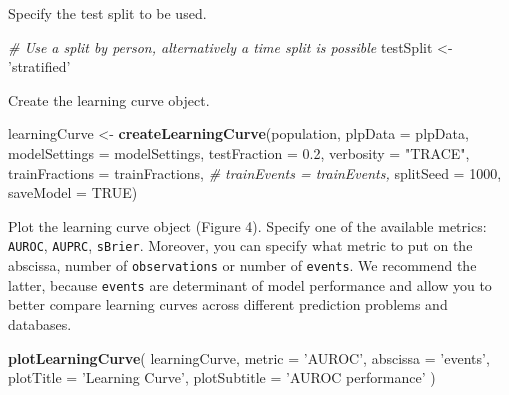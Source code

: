 \documentclass[
]{article}
\newenvironment{Shaded}{\begin{snugshade}}{\end{snugshade}}
\newcommand{\CommentTok}[1]{\textcolor[rgb]{0.56,0.35,0.01}{\textit{#1}}}
\newcommand{\DataTypeTok}[1]{\textcolor[rgb]{0.13,0.29,0.53}{#1}}
\newcommand{\DecValTok}[1]{\textcolor[rgb]{0.00,0.00,0.81}{#1}}
\newcommand{\FloatTok}[1]{\textcolor[rgb]{0.00,0.00,0.81}{#1}}
\newcommand{\KeywordTok}[1]{\textcolor[rgb]{0.13,0.29,0.53}{\textbf{#1}}}
\newcommand{\NormalTok}[1]{#1}
\newcommand{\OtherTok}[1]{\textcolor[rgb]{0.56,0.35,0.01}{#1}}
\newcommand{\StringTok}[1]{\textcolor[rgb]{0.31,0.60,0.02}{#1}}
\begin{document}
Specify the test split to be used.

\begin{Shaded}
\begin{Highlighting}[]
\CommentTok{# Use a split by person, alternatively a time split is possible}
\NormalTok{testSplit <-}\StringTok{ 'stratified'}
\end{Highlighting}
\end{Shaded}

Create the learning curve object.

\begin{Shaded}
\begin{Highlighting}[]
\NormalTok{learningCurve <-}\StringTok{ }\KeywordTok{createLearningCurve}\NormalTok{(population,}
                                     \DataTypeTok{plpData =}\NormalTok{ plpData,}
                                     \DataTypeTok{modelSettings =}\NormalTok{ modelSettings,}
                                     \DataTypeTok{testFraction =} \FloatTok{0.2}\NormalTok{,}
                                     \DataTypeTok{verbosity =} \StringTok{"TRACE"}\NormalTok{,}
                                     \DataTypeTok{trainFractions =}\NormalTok{ trainFractions,}
                                     \CommentTok{# trainEvents = trainEvents,}
                                     \DataTypeTok{splitSeed =} \DecValTok{1000}\NormalTok{,}
                                     \DataTypeTok{saveModel =} \OtherTok{TRUE}\NormalTok{)}
\end{Highlighting}
\end{Shaded}

Plot the learning curve object (Figure 4). Specify one of the available
metrics: \texttt{AUROC}, \texttt{AUPRC}, \texttt{sBrier}. Moreover, you
can specify what metric to put on the abscissa, number of
\texttt{observations} or number of \texttt{events}. We recommend the
latter, because \texttt{events} are determinant of model performance and
allow you to better compare learning curves across different prediction
problems and databases.

\begin{Shaded}
\begin{Highlighting}[]
\KeywordTok{plotLearningCurve}\NormalTok{(}
\NormalTok{  learningCurve,}
  \DataTypeTok{metric =} \StringTok{'AUROC'}\NormalTok{,}
  \DataTypeTok{abscissa =} \StringTok{'events'}\NormalTok{,}
  \DataTypeTok{plotTitle =} \StringTok{'Learning Curve'}\NormalTok{,}
  \DataTypeTok{plotSubtitle =} \StringTok{'AUROC performance'}
\NormalTok{)}
\end{Highlighting}
\end{Shaded}
\end{document}
